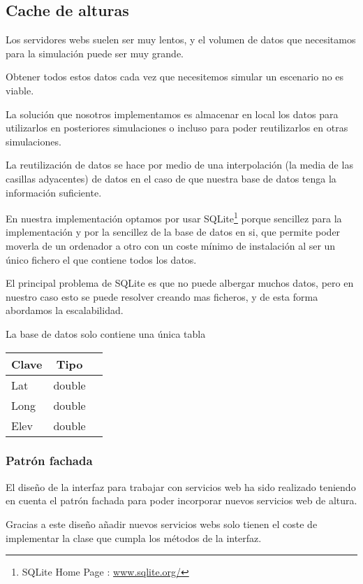 \subsection*{Cache de alturas}
Los servidores webs suelen ser muy lentos, y el volumen de datos que
necesitamos para la simulación puede ser muy grande.

Obtener todos estos datos cada vez que necesitemos simular un escenario no es
viable.

La solución que nosotros implementamos es almacenar en local los datos para
utilizarlos en posteriores simulaciones o incluso para poder reutilizarlos en
otras simulaciones.

La reutilización de datos se hace por medio de una interpolación (la media de
las casillas adyacentes) de datos en el caso de que nuestra base de datos tenga
la información suficiente.

En nuestra implementación optamos por usar  SQLite\footnote{SQLite Home Page :
\url{www.sqlite.org/}} porque sencillez para la
implementación y por la sencillez de la base de datos en si, que permite poder
moverla de un ordenador a otro con un coste mínimo de instalación al ser un
único fichero el que contiene todos los datos.

El principal problema de SQLite es que no puede albergar muchos datos, pero en
nuestro caso esto se puede resolver creando mas ficheros, y de esta forma
abordamos la escalabilidad.

La base de datos solo contiene una única tabla
\begin{center}
\begin{tabular}{ | l | c | r | }
\hline
Clave & Tipo \\ \hline
Lat & double \\ \hline
Long & double \\ \hline
Elev & double \\ \hline
\end{tabular}
\end{center}


\subsubsection*{Patrón fachada}
El diseño de la interfaz para trabajar con servicios web ha sido realizado
teniendo en cuenta el patrón fachada para poder incorporar nuevos servicios web
de altura.

Gracias a este diseño añadir nuevos servicios webs solo tienen el coste de
implementar la clase que cumpla los métodos de la interfaz.
